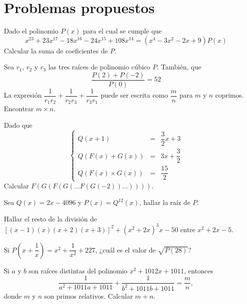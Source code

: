 \section{Problemas propuestos}

\begin{section-problem}
    Dado el polinomio $P(x)$ para el cual se cumple que
    \[x^{23} + 23x^{17} - 18x^{16} - 24x^{15} + 108x^{14} = (x^4 - 3x^2 - 2x + 9)P(x)\]
    Calcular la suma de coeficientes de $P$.
\end{section-problem}

\begin{section-problem}
    Sea $r_1$, $r_2$ y $r_3$ las tres raíces de polinomio cúbico $P$.
    También, que
    \[\frac{P(2) + P(-2)}{P(0)} = 52\]
    La expresión $\dfrac{1}{r_1 r_2} + \dfrac{1}{r_2 r_3} + \dfrac{1}{r_3 r_1}$ puede ser escrita como $\dfrac{m}{n}$ para $m$ y $n$ coprimos.
    Encontrar $m\times n$.
\end{section-problem}

\begin{section-problem}
    Dado que
    \[
        \left\{
        \begin{array}{rcl}
            Q(x + 1) & =& \dfrac{3}{2} x + 3\\
            Q( F(x) + G(x) ) & =& 3x + \dfrac{3}{2}\\
            Q( F(x) \times G(x) ) & =& \dfrac{15}{2}
        \end{array}
        \right.
    \]
    Calcular $F(G(F(G(\dots F(G(-2))\dots))))$.
\end{section-problem}

\begin{section-problem}
    Sea $Q(x) = 2x - 4096$ y $P(x) = Q^{12}(x)$, hallar la raíz de $P$.
\end{section-problem}

\begin{section-problem}
    Hallar el resto de la división de $\left[(x - 1)(x)(x + 2)(x + 3)\right]^2 + (x^2 + 2x)^3 x - 50$ entre $x^2 + 2x - 5$.
\end{section-problem}

\begin{section-problem}
    Si $P\left(x + \dfrac{1}{x}\right) = x^2 + \dfrac{1}{x^2} + 227$, ¿cuál es el valor de $\sqrt {P(28)}$?
\end{section-problem}

\begin{section-problem}
    Si $a$ y $b$ son raíces distintas del polinomio $x^2 + 1012x + 1011$, entonces
    \[\frac{1}{a^2 + 1011a + 1011} + \frac{1}{b^2 + 1011b + 1011} = \frac{m}{n},\]
    donde $m$ y $n$ son primos relativos.
    Calcular $m + n$.
\end{section-problem}

